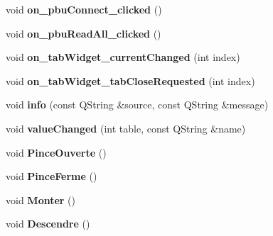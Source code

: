 \begin{DoxyCompactItemize}
\item 
\hypertarget{classmanuel_a183a95b22521bfe735af3e2fbb4d9c6a}{}void {\bfseries on\+\_\+pbu\+Connect\+\_\+clicked} ()\label{classmanuel_a183a95b22521bfe735af3e2fbb4d9c6a}

\item 
\hypertarget{classmanuel_a67f7ff61f8a893ee477c3a212acf7a5b}{}void {\bfseries on\+\_\+pbu\+Read\+All\+\_\+clicked} ()\label{classmanuel_a67f7ff61f8a893ee477c3a212acf7a5b}

\item 
\hypertarget{classmanuel_a0f7554cdd82ddcd8343922ebdae44307}{}void {\bfseries on\+\_\+tab\+Widget\+\_\+current\+Changed} (int index)\label{classmanuel_a0f7554cdd82ddcd8343922ebdae44307}

\item 
\hypertarget{classmanuel_a4aa5f6166c22d218b9f5a208bb4d7ff3}{}void {\bfseries on\+\_\+tab\+Widget\+\_\+tab\+Close\+Requested} (int index)\label{classmanuel_a4aa5f6166c22d218b9f5a208bb4d7ff3}

\item 
\hypertarget{classmanuel_ab62cef62b9f9b30c8f92646ad643937b}{}void {\bfseries info} (const Q\+String \&source, const Q\+String \&message)\label{classmanuel_ab62cef62b9f9b30c8f92646ad643937b}

\item 
\hypertarget{classmanuel_a2549f1e2f5105bdb534483ef9908627a}{}void {\bfseries value\+Changed} (int table, const Q\+String \&name)\label{classmanuel_a2549f1e2f5105bdb534483ef9908627a}

\item 
\hypertarget{classmanuel_a601f4380110f989d7a2c56321af45bab}{}void {\bfseries Pince\+Ouverte} ()\label{classmanuel_a601f4380110f989d7a2c56321af45bab}

\item 
\hypertarget{classmanuel_ac5273c2bc152012426da7c821055e913}{}void {\bfseries Pince\+Ferme} ()\label{classmanuel_ac5273c2bc152012426da7c821055e913}

\item 
\hypertarget{classmanuel_a638a51cdd8db88e68b2c381f21d48a33}{}void {\bfseries Monter} ()\label{classmanuel_a638a51cdd8db88e68b2c381f21d48a33}

\item 
\hypertarget{classmanuel_af8478db2f4f3b6cec565c194242ae9e9}{}void {\bfseries Descendre} ()\label{classmanuel_af8478db2f4f3b6cec565c194242ae9e9}


\end{DoxyCompactItemize}

